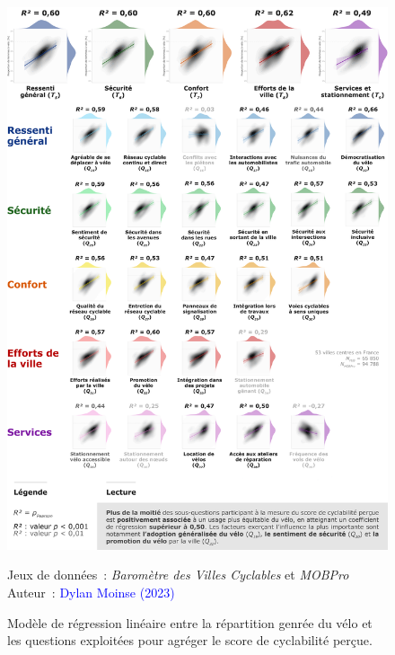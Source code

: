 \begin{refsegment}
    \begin{figure}[h!]\vspace*{4pt}
        \caption{Modèle de régression linéaire entre la répartition genrée du vélo et les questions exploitées pour agréger le score de cyclabilité perçue.}
        \label{fig-chap4:regression-genre-cyclabilite-questions-detailees}
        \centerline{\includegraphics[width=1\columnwidth]{src/Figures/Chap-4/FR_Regression_sous_facteurs_OLS.png}}
        \vspace{5pt}
        \begin{flushright}\scriptsize{
        Jeux de données~: \textsl{Baromètre des Villes Cyclables} \textcolor{blue}{\autocite{fub_barometre_2021}} et \textsl{MOBPro} \textcolor{blue}{\autocite{insee_documentation_2023}}
        \\
        Auteur~: \textcolor{blue}{Dylan Moinse (2023)}
        }\end{flushright}
    \end{figure}


\end{refsegment}
